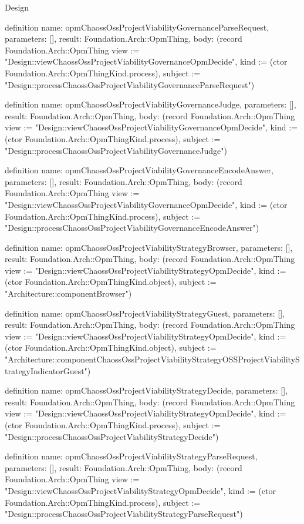 \begin{lexlean}{Design}
\begin{semanticmodule}
definition{
  name: opmChaossOssProjectViabilityGovernanceParseRequest,
  parameters: [],
  result: Foundation.Arch::OpmThing,
  body: (record Foundation.Arch::OpmThing {view := "Design::viewChaossOssProjectViabilityGovernanceOpmDecide", kind := (ctor Foundation.Arch::OpmThingKind.process), subject := "Design::processChaossOssProjectViabilityGovernanceParseRequest"})
}

definition{
  name: opmChaossOssProjectViabilityGovernanceJudge,
  parameters: [],
  result: Foundation.Arch::OpmThing,
  body: (record Foundation.Arch::OpmThing {view := "Design::viewChaossOssProjectViabilityGovernanceOpmDecide", kind := (ctor Foundation.Arch::OpmThingKind.process), subject := "Design::processChaossOssProjectViabilityGovernanceJudge"})
}

definition{
  name: opmChaossOssProjectViabilityGovernanceEncodeAnswer,
  parameters: [],
  result: Foundation.Arch::OpmThing,
  body: (record Foundation.Arch::OpmThing {view := "Design::viewChaossOssProjectViabilityGovernanceOpmDecide", kind := (ctor Foundation.Arch::OpmThingKind.process), subject := "Design::processChaossOssProjectViabilityGovernanceEncodeAnswer"})
}

definition{
  name: opmChaossOssProjectViabilityStrategyBrowser,
  parameters: [],
  result: Foundation.Arch::OpmThing,
  body: (record Foundation.Arch::OpmThing {view := "Design::viewChaossOssProjectViabilityStrategyOpmDecide", kind := (ctor Foundation.Arch::OpmThingKind.object), subject := "Architecture::componentBrowser"})
}

definition{
  name: opmChaossOssProjectViabilityStrategyGuest,
  parameters: [],
  result: Foundation.Arch::OpmThing,
  body: (record Foundation.Arch::OpmThing {view := "Design::viewChaossOssProjectViabilityStrategyOpmDecide", kind := (ctor Foundation.Arch::OpmThingKind.object), subject := "Architecture::componentChaossOssProjectViabilityStrategyOSSProjectViabilityStrategyIndicatorGuest"})
}

definition{
  name: opmChaossOssProjectViabilityStrategyDecide,
  parameters: [],
  result: Foundation.Arch::OpmThing,
  body: (record Foundation.Arch::OpmThing {view := "Design::viewChaossOssProjectViabilityStrategyOpmDecide", kind := (ctor Foundation.Arch::OpmThingKind.process), subject := "Design::processChaossOssProjectViabilityStrategyDecide"})
}

definition{
  name: opmChaossOssProjectViabilityStrategyParseRequest,
  parameters: [],
  result: Foundation.Arch::OpmThing,
  body: (record Foundation.Arch::OpmThing {view := "Design::viewChaossOssProjectViabilityStrategyOpmDecide", kind := (ctor Foundation.Arch::OpmThingKind.process), subject := "Design::processChaossOssProjectViabilityStrategyParseRequest"})
}


\end{semanticmodule}
\end{lexlean}

